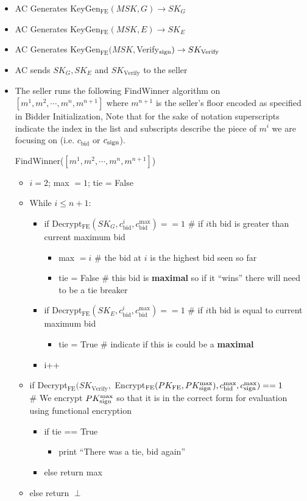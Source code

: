 \documentclass[12pt,twoside]{reedthesis}
\begin{document}
       \begin{itemize}
       \item AC Generates KeyGen$_\text{FE}(MSK,G) \to SK_G$
       \item AC Generates KeyGen$_\text{FE}(MSK,E) \to SK_E$
       \item AC Generates KeyGen$_\text{FE}(MSK,$Verify$_\text{sign}) \to SK_\text{Verify}$
       \item AC sends $SK_G, SK_E$ and $SK_\text{Verify}$ to the seller
       \item The seller runs the following FindWinner algorithm on  $[m^1,m^2, \cdots , m^n, m^{n+1}]$ where $m^{n+1}$ is the seller's floor encoded as specified in Bidder Initialization, Note that for the sake of notation superscripts indicate the index in the list and subscripts describe the piece of $m^i$ we are focusing on (i.e. $c_\text{bid}$ or $c_\text{sign}$).
       \par FindWinner($[m^1,m^2,\cdots,m^n,m^{n+1}]$) 
       	\begin{itemize}
	\item $i = 2$; max $= 1$; tie = False
	\item While $i\leq n+1$:
		\begin{itemize}
		\item if Decrypt$_\text{FE}(SK_G,c_\text{bid}^i,
		c_\text{bid}^\text{max}) == 1$ \# if $i$th bid is greater than current maximum bid
			\begin{itemize}
			\item max $= i$ \# the bid at $i$ is the highest bid seen so far
			\item tie = False \# this bid is \textbf{maximal} so if it ``wins'' there will need to be a tie breaker
			\end{itemize}
		\item if Decrypt$_\text{FE}(SK_E,c_\text{bid}^i,
		c_\text{bid}^\text{max}) == 1$ \# if $i$th bid is equal to current maximum bid
			\begin{itemize}
			\item tie = True \# indicate if this is could be a \textbf{maximal}
			\end{itemize}
		\item i++
		\end{itemize}
	\item if Decrypt$_\text{FE}(SK_\text{Verify},$ Encrypt$_\text{FE}(PK_\text{FE},PK_\text{sign}^\text{max}), c_\text{bid}^\text{max},c_\text{sign}^\text{max}) == 1$ \\ \# We encrypt $PK_\text{sign}^\text{max}$ so that it is in the correct form for evaluation using functional encryption
		\begin{itemize}
		\item if tie == True
			\begin{itemize}
			\item print ``There was a tie, bid again''
			\end{itemize}
		\item else return max
		\end{itemize}
	\item else return $\perp$
	\end{itemize}
	

\end{itemize}
\end{document}
